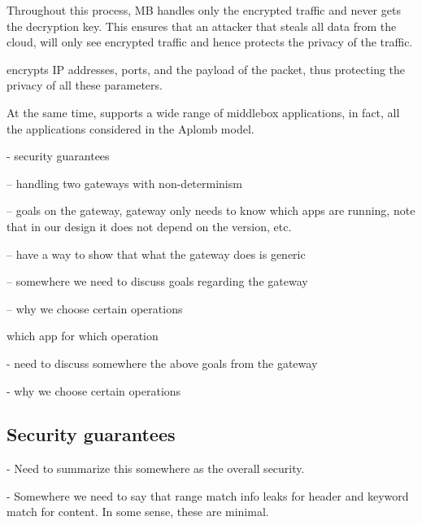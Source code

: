 Throughout this process, MB handles only the encrypted traffic and never gets the decryption key. This ensures
that an attacker that steals all data from the cloud, will only see encrypted traffic and hence protects the privacy of the 
traffic. 

\sys encrypts IP addresses, ports, and the payload of the packet, thus protecting the privacy of all these parameters. 

At the same time, \sys supports a wide range of middlebox applications, in fact, all the applications considered in the 
Aplomb model.




- security guarantees


-- handling two gateways with non-determinism




-- goals on the gateway, gateway only needs to know which apps are running, note that in our design
it does not depend on the version, etc. 

-- have a way to show that what the gateway does is generic 
   
-- somewhere we need to discuss goals regarding the gateway

-- why we choose certain operations

which app for which operation


- need to discuss somewhere the above goals from the gateway


- why we choose certain operations

\subsection{Security guarantees}
- Need to summarize this somewhere as the overall security.

- Somewhere we need to say that range match info leaks for header and keyword match for content. In some sense, these are minimal. 
